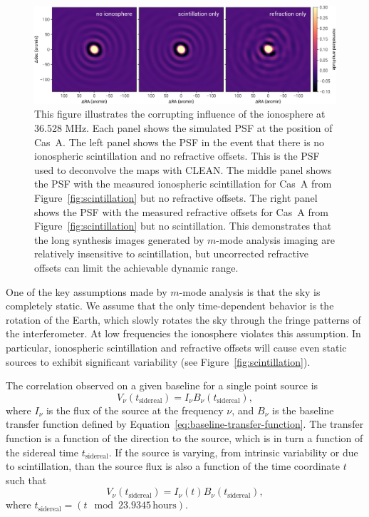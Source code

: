 \documentclass[twocolumn]{aastex61}
\begin{document}
\begin{figure}[t]
    \includegraphics[width=\textwidth]{figures/ionospheric-simulations/ionospheric-simulations}
    \caption{
        This figure illustrates the corrupting influence of the ionosphere at 36.528 MHz. Each panel
        shows the simulated PSF at the position of Cas~A. The left panel shows the PSF in the event
        that there is no ionospheric scintillation and no refractive offsets. This is the PSF used
        to deconvolve the maps with CLEAN. The middle panel shows the PSF with the measured
        ionospheric scintillation for Cas~A from Figure~\ref{fig:scintillation} but no refractive
        offsets. The right panel shows the PSF with the measured refractive offsets for Cas~A from
        Figure~\ref{fig:scintillation} but no scintillation. This demonstrates that the long
        synthesis images generated by $m$-mode analysis imaging are relatively insensitive to
        scintillation, but uncorrected refractive offsets can limit the achievable dynamic range.
    }
    \label{fig:ionospheric-simulations}
\end{figure}

One of the key assumptions made by $m$-mode analysis is that the sky is completely static.  We
assume that the only time-dependent behavior is the rotation of the Earth, which slowly rotates the
sky through the fringe patterns of the interferometer. At low frequencies the ionosphere violates
this assumption. In particular, ionospheric scintillation and refractive offsets will cause even
static sources to exhibit significant variability (see Figure~\ref{fig:scintillation}).

The correlation observed on a given baseline for a single point source is
\begin{equation}
    V_\nu(t_{\textrm{sidereal}}) = I_\nu B_\nu(t_{\textrm{sidereal}}),
\end{equation}
where $I_\nu$ is the flux of the source at the frequency $\nu$, and $B_\nu$ is the baseline transfer
function defined by Equation~\ref{eq:baseline-transfer-function}. The transfer function is a
function of the direction to the source, which is in turn a function of the sidereal time
$t_{\textrm{sidereal}}$. If the source is varying, from intrinsic variability or due to
scintillation, than the source flux is also a function of the time coordinate $t$ such that
\begin{equation}
    V_\nu(t_{\textrm{sidereal}}) = I_\nu(t) B_\nu(t_{\textrm{sidereal}}),
\end{equation}
where $t_{\textrm{sidereal}} = (t \mod 23.9345\,\textrm{hours})$.
\end{document}
